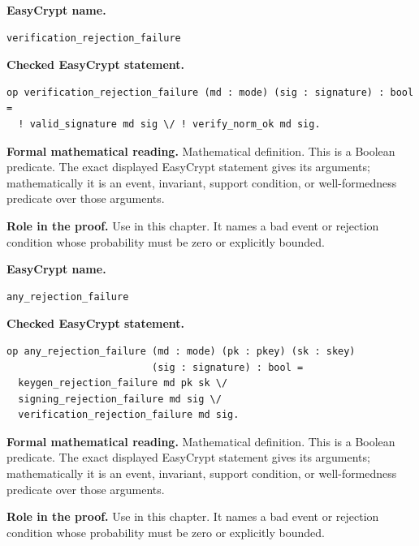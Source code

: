 \begin{formaldefinition}
\noindent\textbf{EasyCrypt name.}
\begin{lstlisting}[language=EasyCrypt,basicstyle=\ttfamily\scriptsize]
verification_rejection_failure
\end{lstlisting}
\noindent\textbf{Checked EasyCrypt statement.}
\begin{lstlisting}[language=EasyCrypt,basicstyle=\ttfamily\scriptsize]
op verification_rejection_failure (md : mode) (sig : signature) : bool =
  ! valid_signature md sig \/ ! verify_norm_ok md sig.
\end{lstlisting}
\noindent\textbf{Formal mathematical reading.}
Mathematical definition. This is a Boolean predicate.  The exact displayed EasyCrypt statement gives its arguments; mathematically it is an event, invariant, support condition, or well-formedness predicate over those arguments.

\noindent\textbf{Role in the proof.}
Use in this chapter. It names a bad event or rejection condition whose probability must be zero or explicitly bounded.

\end{formaldefinition}

\begin{formaldefinition}
\noindent\textbf{EasyCrypt name.}
\begin{lstlisting}[language=EasyCrypt,basicstyle=\ttfamily\scriptsize]
any_rejection_failure
\end{lstlisting}
\noindent\textbf{Checked EasyCrypt statement.}
\begin{lstlisting}[language=EasyCrypt,basicstyle=\ttfamily\scriptsize]
op any_rejection_failure (md : mode) (pk : pkey) (sk : skey)
                         (sig : signature) : bool =
  keygen_rejection_failure md pk sk \/
  signing_rejection_failure md sig \/
  verification_rejection_failure md sig.
\end{lstlisting}
\noindent\textbf{Formal mathematical reading.}
Mathematical definition. This is a Boolean predicate.  The exact displayed EasyCrypt statement gives its arguments; mathematically it is an event, invariant, support condition, or well-formedness predicate over those arguments.

\noindent\textbf{Role in the proof.}
Use in this chapter. It names a bad event or rejection condition whose probability must be zero or explicitly bounded.

\end{formaldefinition}


